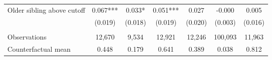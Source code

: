 {{\begin{tabular}{lcccccc}
Older sibling above cutoff&       0.067***&       0.033*  &       0.051***&       0.027   &      -0.000   &       0.005   \\
                    &     (0.019)   &     (0.018)   &     (0.019)   &     (0.020)   &     (0.003)   &     (0.016)   \\
                    &               &               &               &               &               &               \\
Observations        &      12,670   &       9,534   &      12,921   &      12,246   &     100,093   &      11,963   \\
Counterfactual mean &       0.448   &       0.179   &       0.641   &       0.389   &       0.038   &       0.812   \\
 

\bottomrule
\end{tabular}
}
}

